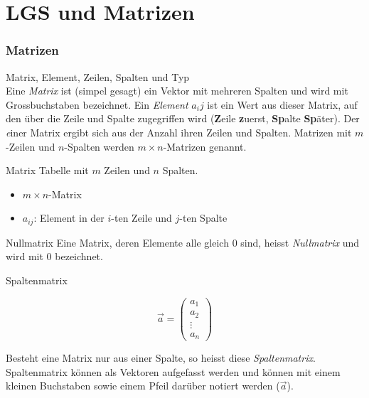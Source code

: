 \graphicspath{{images/}}
\section*{LGS und Matrizen}

\subsubsection*{Matrizen}

    \begin{definition}{{Matrix, Element, Zeilen, Spalten und Typ}}\\
        Eine \textit{Matrix} ist (simpel gesagt) ein Vektor mit mehreren Spalten 
        und wird mit Grossbuchstaben bezeichnet.
        Ein \textit{Element} $a_ij$ ist ein Wert aus dieser Matrix,
        auf den über die Zeile und Spalte zugegriffen wird (\textbf{Z}eile \textbf{z}uerst,
        \textbf{Sp}alte \textbf{Sp}äter).
        Der \textit einer Matrix ergibt sich aus der Anzahl ihren Zeilen und Spalten.
        Matrizen mit $m$-Zeilen und $n$-Spalten werden $m\times n$-Matrizen genannt.
    \end{definition}

    \begin{definition}{Matrix}
        Tabelle mit $m$ Zeilen und $n$ Spalten.
        \begin{itemize}
            \item $m \times n$-Matrix
            \item $a_{ij}$: Element in der $i$-ten Zeile und $j$-ten Spalte
        \end{itemize}
    \end{definition}

    \begin{definition}{Nullmatrix}
        Eine Matrix, deren Elemente alle gleich $0$ sind, heisst \textit{Nullmatrix} und wird mit $0$ bezeichnet.
    \end{definition}

    \begin{definition}{Spaltenmatrix}
        \begin{figure}
            \vspace{-20pt}
            \begin{equation*}
                \vec{a}=\begin{pmatrix}
                    a_1\\a_2\\\vdots\\a_n
                \end{pmatrix}
            \end{equation*}
        \end{figure}
        Besteht eine Matrix nur aus einer Spalte, so heisst diese \textit{Spaltenmatrix}.
        Spaltenmatrix können als Vektoren aufgefasst werden und können mit einem kleinen Buchstaben 
        sowie einem Pfeil darüber notiert werden ($\vec{a}$). 
    \end{definition}
    
